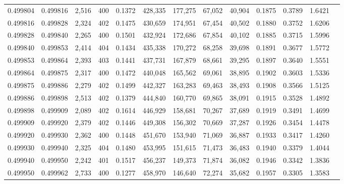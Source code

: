 \begin{tabular}{rrrrrrrrrrrrr}
0.499804 & 0.499816 & 2,516 & 400 &                                     0.1372 & 428,335 & 177,275 &  67,052 &  40,904 & 0.1875 & 0.3789 & 1.6421 \\
0.499816 & 0.499828 & 2,324 & 402 &                                     0.1475 & 430,659 & 174,951 &  67,454 &  40,502 & 0.1880 & 0.3752 & 1.6206 \\
0.499828 & 0.499840 & 2,265 & 400 &                                     0.1501 & 432,924 & 172,686 &  67,854 &  40,102 & 0.1885 & 0.3715 & 1.5996 \\
0.499840 & 0.499853 & 2,414 & 404 &                                     0.1434 & 435,338 & 170,272 &  68,258 &  39,698 & 0.1891 & 0.3677 & 1.5772 \\
0.499853 & 0.499864 & 2,393 & 403 &                                     0.1441 & 437,731 & 167,879 &  68,661 &  39,295 & 0.1897 & 0.3640 & 1.5551 \\
0.499864 & 0.499875 & 2,317 & 400 &                                     0.1472 & 440,048 & 165,562 &  69,061 &  38,895 & 0.1902 & 0.3603 & 1.5336 \\
0.499875 & 0.499886 & 2,279 & 402 &                                     0.1499 & 442,327 & 163,283 &  69,463 &  38,493 & 0.1908 & 0.3566 & 1.5125 \\
0.499886 & 0.499898 & 2,513 & 402 &                                     0.1379 & 444,840 & 160,770 &  69,865 &  38,091 & 0.1915 & 0.3528 & 1.4892 \\
0.499898 & 0.499909 & 2,089 & 402 &                                     0.1614 & 446,929 & 158,681 &  70,267 &  37,689 & 0.1919 & 0.3491 & 1.4699 \\
0.499909 & 0.499920 & 2,379 & 402 &                                     0.1446 & 449,308 & 156,302 &  70,669 &  37,287 & 0.1926 & 0.3454 & 1.4478 \\
0.499920 & 0.499930 & 2,362 & 400 &                                     0.1448 & 451,670 & 153,940 &  71,069 &  36,887 & 0.1933 & 0.3417 & 1.4260 \\
0.499930 & 0.499940 & 2,325 & 404 &                                     0.1480 & 453,995 & 151,615 &  71,473 &  36,483 & 0.1940 & 0.3379 & 1.4044 \\
0.499940 & 0.499950 & 2,242 & 401 &                                     0.1517 & 456,237 & 149,373 &  71,874 &  36,082 & 0.1946 & 0.3342 & 1.3836 \\
0.499950 & 0.499962 & 2,733 & 400 &                                     0.1277 & 458,970 & 146,640 &  72,274 &  35,682 & 0.1957 & 0.3305 & 1.3583 \\

\end{tabular}
